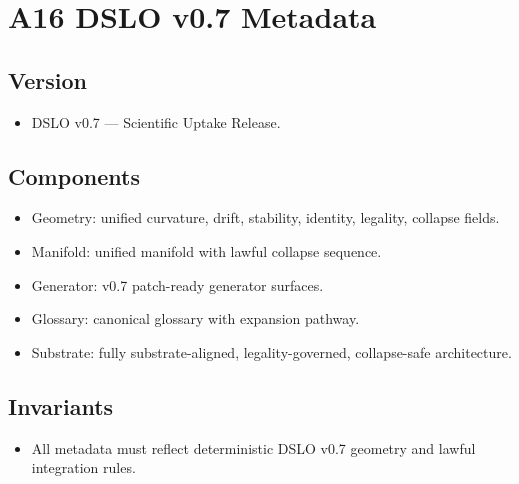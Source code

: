 \section{A16 DSLO v0.7 Metadata}

\subsection{Version}
\begin{itemize}
    \item DSLO v0.7 — Scientific Uptake Release.
\end{itemize}

\subsection{Components}
\begin{itemize}
    \item Geometry: unified curvature, drift, stability, identity, legality, collapse fields.
    \item Manifold: unified manifold with lawful collapse sequence.
    \item Generator: v0.7 patch-ready generator surfaces.
    \item Glossary: canonical glossary with expansion pathway.
    \item Substrate: fully substrate-aligned, legality-governed, collapse-safe architecture.
\end{itemize}

\subsection{Invariants}
\begin{itemize}
    \item All metadata must reflect deterministic DSLO v0.7 geometry and lawful integration rules.
\end{itemize}
